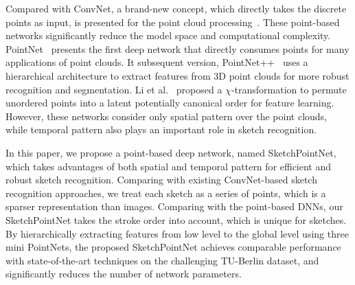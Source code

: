  Compared with ConvNet, a brand-new concept, which directly takes the discrete points as input, is presented for the point cloud processing~\cite{qi2017pointnet, qi2017pointnetplusplus, 1801.07791}.
These point-based networks significantly reduce the model space and computational complexity.
%
PointNet~\cite{qi2017pointnet} presents the first deep network that directly consumes points for many applications of point clouds.
It subsequent version, PointNet++~\cite{qi2017pointnetplusplus} uses a hierarchical architecture to extract features from 3D point clouds for more robust recognition and segmentation.
%
Li et al.~\cite{1801.07791} proposed a $\chi$-transformation to permute unordered points into a latent potentially canonical order for feature learning.
However, these networks consider only spatial pattern over the point clouds, while temporal pattern also plays an important role in sketch recognition.



In this paper, we propose a point-based deep network, named SketchPointNet, which takes advantages of both spatial and temporal pattern for efficient and robust sketch recognition.
%
Comparing with existing ConvNet-based sketch recognition approaches, we treat each sketch as a series of points, which is a sparser representation than images. 
Comparing with the point-based DNNs, our SketchPointNet takes the stroke order into account, which is unique for sketches.
%
By hierarchically extracting features from low level to the global level using three mini PointNets, the proposed SketchPointNet achieves comparable performance with state-of-the-art techniques on the challenging TU-Berlin dataset, and significantly reduces the number of network parameters.
 